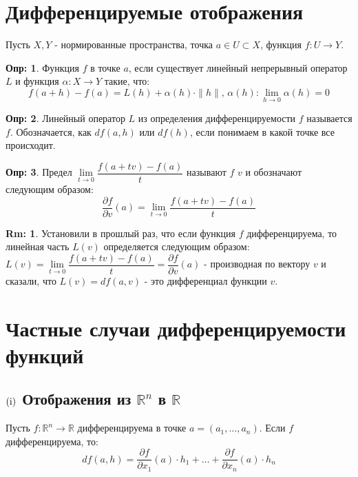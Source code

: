 \documentclass[12pt]{article}
\newcommand{\RN}[1]{%
	\textup{\uppercase\expandafter{\romannumeral#1}}%
}
\newcommand{\MR}{\mathbb{R}}
\theoremstyle{definition}
\newtheorem{defn}{Опр:}
\newtheorem{rem}{Rm:}
\begin{document}
\lhead{Математический анализ - \RN{2}}
\section*{Дифференцируемые отображения}
Пусть $X, Y$ - нормированные пространства, точка $a \in U \subset X$, функция $f\colon U \to Y$.
\begin{defn}
	Функция $f$  в точке $a$, если существует линейный непрерывный оператор $L$ и функция $\alpha \colon X \to Y$ такие, что:
	$$
	f(a + h) - f(a) = L(h) + \alpha(h){\cdot}\|h\|, \, \alpha(h) \colon \lim\limits_{h \to 0}{\alpha(h)} = 0
	$$ 
\end{defn}
\begin{defn}
	Линейный оператор $L$ из определения дифференцируемости $f$ называется  $f$. Обозначается, как $df(a,h)$ или $df(h)$, если понимаем в какой точке все происходит.
\end{defn}
\begin{defn}
	Предел $\lim\limits_{t \to 0} \dfrac{f(a + tv) - f(a)}{t}$ называют  $f$  $v$ и обозначают следующим образом: 
	$$
	\dfrac{\partial f}{\partial v}(a) = \lim\limits_{t \to 0} \dfrac{f(a + tv) - f(a)}{t}
	$$
\end{defn}
\begin{rem}
	Установили в прошлый раз, что если функция $f$ дифференцируема, то линейная часть $L(v)$ определяется следующим образом: $L(v) = \lim\limits_{t \to 0} \dfrac{f(a + tv) - f(a)}{t} = \dfrac{\partial f}{\partial v}(a)$ - производная по вектору $v$ и сказали, что $L(v) = df(a,v)$ - это дифференциал функции $v$.
\end{rem}

\section*{Частные случаи дифференцируемости функций}
\subsection*{$(\RN{1})$ Отображения из $\MR^n$ в $\MR$}

Пусть $f \colon \MR^n \to \MR$ дифференцируема в точке $a = (a_1, \dotsc, a_n)$. Если $f$ дифференцируема, то:
$$
	df(a,h) = \dfrac{\partial f}{\partial x_1}(a){\cdot}h_1 + \dotsc + \dfrac{\partial f}{\partial x_n}(a){\cdot} h_n
$$
\end{document}
